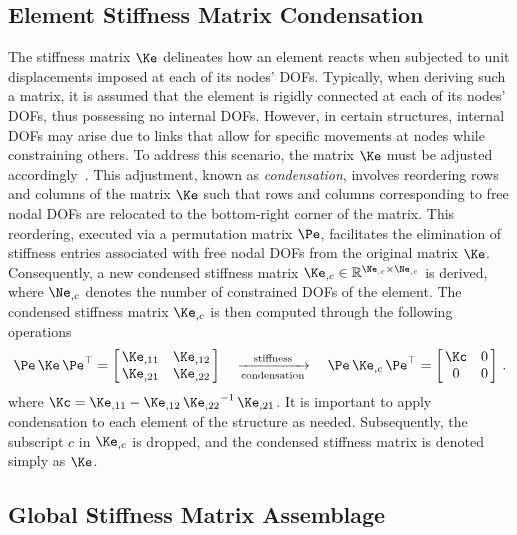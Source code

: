 \subsection{Element Stiffness Matrix Condensation}

The stiffness matrix $\Ke$ delineates how an element reacts when subjected to unit displacements imposed at each of its nodes' \acp{DOF}. Typically, when deriving such a matrix, it is assumed that the element is rigidly connected at each of its nodes' \acp{DOF}, thus possessing no internal \acp{DOF}. However, in certain structures, internal \acp{DOF} may arise due to links that allow for specific movements at nodes while constraining others. To address this scenario, the matrix $\Ke$ must be adjusted accordingly~\cite{logan2002first}. This adjustment, known as \emph{condensation}, involves reordering rows and columns of the matrix $\Ke$ such that rows and columns corresponding to free nodal \acp{DOF} are relocated to the bottom-right corner of the matrix. This reordering, executed via a permutation matrix $\Pe$, facilitates the elimination of stiffness entries associated with free nodal \acp{DOF} from the original matrix $\Ke$. Consequently, a new condensed stiffness matrix ${\Ke}_{,c} \in \mathbb{R}^{{\Ne}_{,c} \times {\Ne}_{,c}}$ is derived, where ${\Ne}_{,c}$ denotes the number of constrained \acp{DOF} of the element. The condensed stiffness matrix ${\Ke}_{,c}$ is then computed through the following operations
%
\begin{equation*}
  \Pe \, \Ke \, \Pe^\top= \left[\,\begin{matrix}
    {\Ke}_{,11} & {\Ke}_{,12} \\
    {\Ke}_{,21} & {\Ke}_{,22}
  \end{matrix}\,\right] \quad \xrightarrow[\text{condensation}]{\text{stiffness}} \quad
   \Pe \, {\Ke}_{,c} \, \Pe^\top = \left[\,\begin{matrix}
    \Kc & 0 \\
    0   & 0
  \end{matrix}\,\right] \, \text{.}
\end{equation*}
%
where $\Kc = {\Ke}_{,11} - {\Ke}_{,12} \, {{\Ke}_{,22}}^{-1} \, {\Ke}_{,21}$. It is important to apply condensation to each element of the structure as needed. Subsequently, the subscript $c$ in ${\Ke}_{,c}$ is dropped, and the condensed stiffness matrix is denoted simply as $\Ke$.

\subsection{Global Stiffness Matrix Assemblage}

